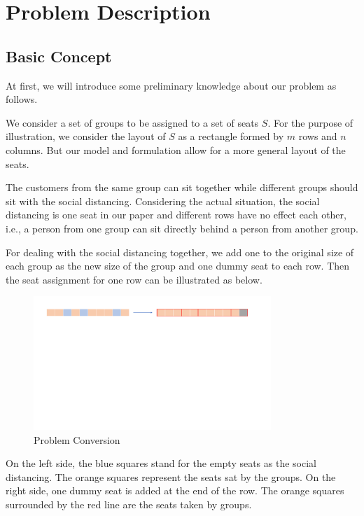 \section{Problem Description}

\subsection{Basic Concept}

At first, we will introduce some preliminary knowledge about our problem as follows.

We consider a set of groups to be assigned to a set of seats $S$. For the purpose of illustration, we consider the layout of $S$ as a rectangle formed by $m$ rows and $n$ columns. But our model and formulation allow for a more general layout of the seats. 

The customers from the same group can sit together while different groups should sit with the social distancing. Considering the actual situation, the social distancing is one seat in our paper and different rows have no effect each other, i.e., a person from one group can sit directly behind a person from another group.

For dealing with the social distancing together, we add one to the original size of each group as the new size of the group and one dummy seat to each row. Then the seat assignment for one row can be illustrated as below. 

\begin{figure}[ht]
    \centering
    \includegraphics[width = 0.8\textwidth]{./Figures/dummy_seat.pdf}
    \caption{Problem Conversion}
\end{figure}

On the left side, the blue squares stand for the empty seats as the social distancing. The orange squares represent the seats sat by the groups. 
On the right side, one dummy seat is added at the end of the row. The orange squares surrounded by the red line are the seats taken by groups.

